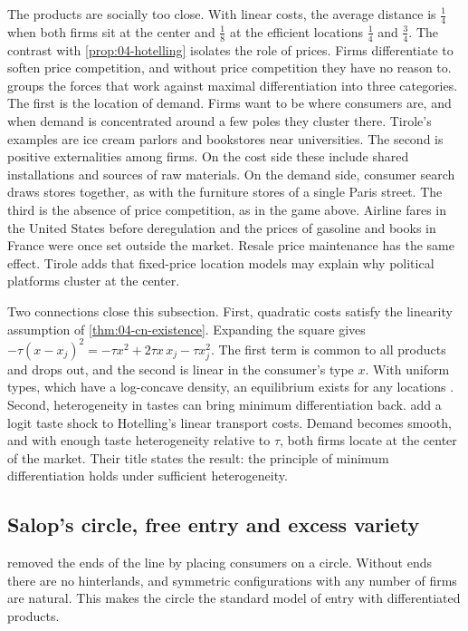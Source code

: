 The products are socially too close. With linear costs, the average distance is $\frac{1}{4}$ when both firms sit
at the center and $\frac{1}{8}$ at the efficient locations $\frac{1}{4}$ and $\frac{3}{4}$. The contrast with
\cref{prop:04-hotelling} isolates the role of prices. Firms differentiate to soften price competition, and without
price competition they have no reason to. \citet[Section 7.1.3]{Tirole1988} groups the forces that work against
maximal differentiation into three categories. The first is the location of demand. Firms want to be where consumers
are, and when demand is concentrated around a few poles they cluster there. Tirole's examples are ice cream parlors
and bookstores near universities. The second is positive externalities among firms. On the cost side these include
shared installations and sources of raw materials. On the demand side, consumer search draws stores together, as
with the furniture stores of a single Paris street. The third is the absence of price competition, as in the game
above. Airline fares in the United States before deregulation and the prices of gasoline and books in France were
once set outside the market. Resale price maintenance has the same effect. Tirole adds that fixed-price location
models may explain why political platforms cluster at the center.

Two connections close this subsection. First, quadratic costs satisfy the linearity assumption of
\cref{thm:04-cn-existence}. Expanding the square gives $-\tau(x - x_j)^2 = -\tau x^2 + 2\tau x\,x_j - \tau x_j^2$. The
first term is common to all products and drops out, and the second is linear in the consumer's type $x$. With
uniform types, which have a log-concave density, an equilibrium exists for any locations
\citep{CaplinNalebuff1991}. Second, heterogeneity in tastes can bring minimum differentiation back.
 add a logit taste shock to Hotelling's linear transport costs. Demand becomes smooth, and with
enough taste heterogeneity relative to $\tau$, both firms locate at the center of the market. Their title states the
result: the principle of minimum differentiation holds under sufficient heterogeneity.

\subsection{Salop's circle, free entry and excess variety}\label{sec:04-salop}

 removed the ends of the line by placing consumers on a circle. Without ends there are no
hinterlands, and symmetric configurations with any number of firms are natural. This makes the circle the standard
model of entry with differentiated products.

